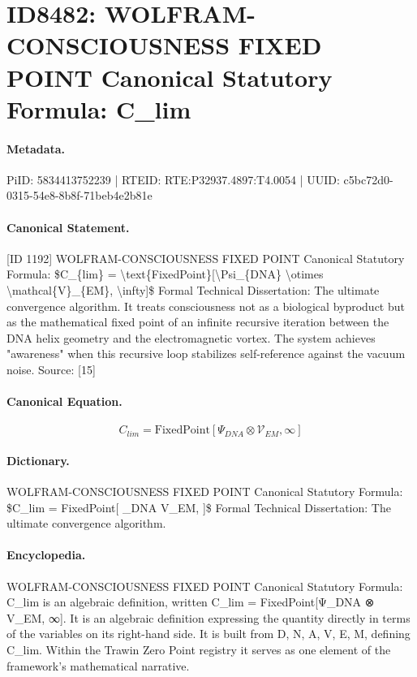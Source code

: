 \section*{ID8482: WOLFRAM-CONSCIOUSNESS FIXED POINT Canonical Statutory Formula: C\_lim}
\paragraph{Metadata.}
PiID: 5834413752239 | RTEID: RTE:P32937.4897:T4.0054 | UUID: c5bc72d0-0315-54e8-8b8f-71beb4e2b81e

\paragraph{Canonical Statement.}
[ID 1192] WOLFRAM-CONSCIOUSNESS FIXED POINT Canonical Statutory Formula: \$C\_\{lim\} = \textbackslash{}text\{FixedPoint\}[\textbackslash{}Psi\_\{DNA\} \textbackslash{}otimes \textbackslash{}mathcal\{V\}\_\{EM\}, \textbackslash{}infty]\$ Formal Technical Dissertation: The ultimate convergence algorithm. It treats consciousness not as a biological byproduct but as the mathematical fixed point of an infinite recursive iteration between the DNA helix geometry and the electromagnetic vortex. The system achieves "awareness" when this recursive loop stabilizes self-reference against the vacuum noise. Source: [15]

\paragraph{Canonical Equation.}
\[
C_{lim} = \text{FixedPoint}[\Psi_{DNA} \otimes \mathcal{V}_{EM}, \infty]
\]

\paragraph{Dictionary.}
WOLFRAM-CONSCIOUSNESS FIXED POINT Canonical Statutory Formula: \$C\_lim = FixedPoint[ \_DNA V\_EM, ]\$ Formal Technical Dissertation: The ultimate convergence algorithm.

\paragraph{Encyclopedia.}
WOLFRAM-CONSCIOUSNESS FIXED POINT Canonical Statutory Formula: C\_lim is an algebraic definition, written C\_lim = FixedPoint[Ψ\_DNA ⊗ V\_EM, ∞]. It is an algebraic definition expressing the quantity directly in terms of the variables on its right-hand side. It is built from D, N, A, V, E, M, defining C\_lim. Within the Trawin Zero Point registry it serves as one element of the framework's mathematical narrative.
